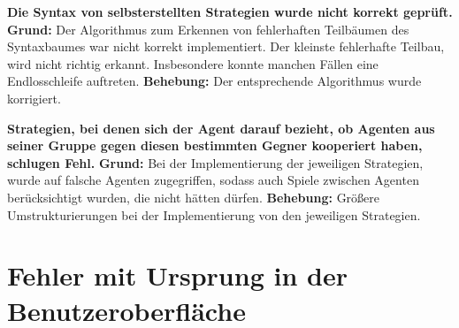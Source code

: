 \documentclass[parskip=full,11pt,openany]{scrreprt}
\begin{document}
\textbf{Die Syntax von selbsterstellten Strategien wurde nicht korrekt geprüft.} \newline
\textbf{Grund: } Der Algorithmus zum Erkennen von fehlerhaften Teilbäumen des Syntaxbaumes war nicht korrekt implementiert. Der kleinste fehlerhafte Teilbau, wird nicht richtig erkannt. Insbesondere konnte manchen Fällen eine Endlosschleife auftreten.
\newline
\textbf{Behebung: } Der entsprechende Algorithmus wurde korrigiert.

\textbf{Strategien, bei denen sich der Agent darauf bezieht, ob Agenten aus seiner Gruppe gegen diesen bestimmten Gegner kooperiert haben, schlugen Fehl.} 
\newline
\textbf{Grund: } Bei der Implementierung der jeweiligen Strategien, wurde auf falsche Agenten zugegriffen, sodass auch Spiele zwischen Agenten berücksichtigt wurden, die nicht hätten dürfen.
\newline
\textbf{Behebung: } Größere Umstrukturierungen bei der Implementierung von den jeweiligen Strategien. 

\section{Fehler mit Ursprung in der Benutzeroberfläche}
\end{document}
